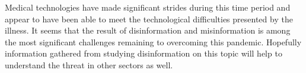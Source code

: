 \documentclass[conference]{IEEEtran}
\begin{document}
Medical technologies have made significant strides during this time period and appear to have been able to meet the technological difficulties presented by the illness.
It seems that the result of disinformation and misinformation is among the most significant challenges remaining to overcoming this pandemic.
Hopefully information gathered from studying disinformation on this topic will help to understand the threat in other sectors as well.



\clearpage


\end{document}
